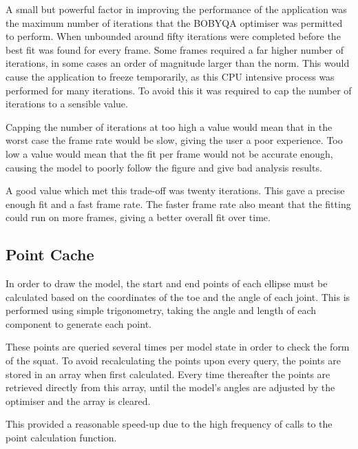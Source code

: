 A small but powerful factor in improving the performance of the application was the maximum number of iterations that the BOBYQA optimiser was permitted to perform. When unbounded around fifty iterations were completed before the best fit was found for every frame. Some frames required a far higher number of iterations, in some cases an order of magnitude larger than the norm. This would cause the application to freeze temporarily, as this CPU intensive process was performed for many iterations. To avoid this it was required to cap the number of iterations to a sensible value.

Capping the number of iterations at too high a value would mean that in the worst case the frame rate would be slow, giving the user a poor experience. Too low a value would mean that the fit per frame would not be accurate enough, causing the model to poorly follow the figure and give bad analysis results.

A good value which met this trade-off was twenty iterations. This gave a precise  enough fit and a fast frame rate. The faster frame rate also meant that the fitting could run on more frames, giving a better overall fit over time.

\subsection{Point Cache}

In order to draw the model, the start and end points of each ellipse must be calculated based on the coordinates of the toe and the angle of each joint. This is performed using simple trigonometry, taking the angle and length of each component to generate each point.

These points are queried several times per model state in order to check the form of the squat. To avoid recalculating the points upon every query, the points are stored in an array when first calculated. Every time thereafter the points are retrieved directly from this array, until the model's angles are adjusted by the optimiser and the array is cleared.

This provided a reasonable speed-up due to the high frequency of calls to the point calculation function.